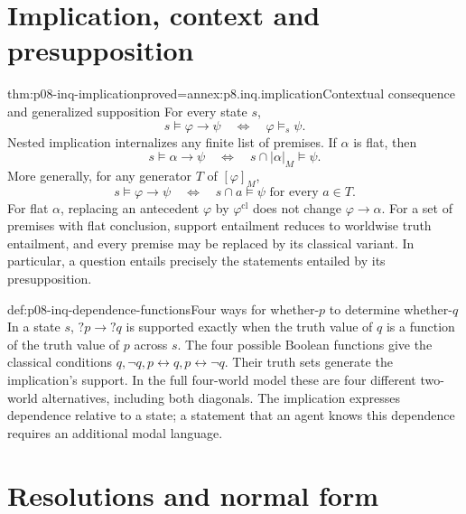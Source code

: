 \section{Implication, context and presupposition}

\begin{hblemma}{thm:p08-inq-implication}{proved=annex:p8.inq.implication}{Contextual consequence and generalized supposition}
For every state \(s\),
\[
 s\models\varphi\to\psi\quad\Longleftrightarrow\quad\varphi\models_s\psi.
\]
Nested implication internalizes any finite list of premises. If \(\alpha\)
is flat, then
\[
 s\models\alpha\to\psi
 \quad\Longleftrightarrow\quad s\cap|\alpha|_M\models\psi.
\]
More generally, for any generator \(T\) of \([\varphi]_M\),
\[
 s\models\varphi\to\psi
 \quad\Longleftrightarrow\quad
 s\cap a\models\psi\text{ for every }a\in T.
\]
For flat \(\alpha\), replacing an antecedent \(\varphi\) by
\(\varphi^{\mathrm{cl}}\) does not change \(\varphi\to\alpha\).
For a set of premises with flat conclusion, support entailment reduces to
worldwise truth entailment, and every premise may be replaced by its classical
variant. In particular, a question entails precisely the statements entailed
by its presupposition.
\end{hblemma}

\begin{hbexample}{def:p08-inq-dependence-functions}{Four ways for whether-\(p\) to determine whether-\(q\)}
In a state \(s\), \(?p\to?q\) is supported exactly when the truth value of
\(q\) is a function of the truth value of \(p\) across \(s\). The four
possible Boolean functions give the classical conditions
\(q,\neg q,p\leftrightarrow q,p\leftrightarrow\neg q\).
Their truth sets generate the implication's support. In the full four-world
model these are four different two-world alternatives, including both
diagonals. The implication expresses dependence relative to a state; a
statement that an agent knows this dependence requires an additional modal
language.
\end{hbexample}

\section{Resolutions and normal form}

